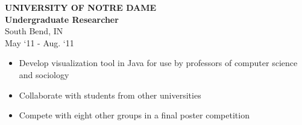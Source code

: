 \documentclass[a4paper,10pt]{article}
\newenvironment{details}
{\begin{itemize}[label=\scalebox{.5}{\ding{117}},leftmargin=0.15in]}
{\end{itemize}}
\begin{document}
\begin{minipage}[t]{0.5\textwidth}
\textbf{UNIVERSITY OF NOTRE DAME\\Undergraduate Researcher}\\
South Bend, IN\\
May ‘11 - Aug. ‘11

\begin{details}
  \item Develop visualization tool in Java for use by professors of
computer science and sociology
  \item Collaborate with students from other universities
  \item Compete with eight other groups in a final poster competition
\end{details}

\end{minipage}
\hspace{0.35 in}
\end{document}
